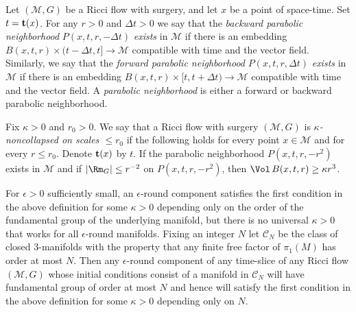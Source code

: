 \begin{definition}
\label{def:parabolic-neighborhood-surgery}
Let $({\mathcal M},G)$ be a Ricci flow with surgery, and let $x$ be
a point of space-time. Set $t={\bf t}(x)$. For any $r>0$ and $\Delta
t>0$ we say that the {\em backward parabolic neighborhood}
$P(x,t,r,-\Delta t)$ {\em exists} in ${\mathcal M}$ if there is an
embedding $B(x,t,r)\times (t-\Delta t,t]\to {\mathcal M}$ compatible
with time and the vector field. Similarly, we say
that the {\em forward parabolic neighborhood} $P(x,t,r,\Delta t)$
{\em exists} in ${\mathcal M}$ if there is an embedding
$B(x,t,r)\times [t,t+\Delta t)\to {\mathcal M}$ compatible with time
and the vector field. A {\em parabolic neighborhood} is either a
forward or backward parabolic neighborhood.
\end{definition}


\begin{definition}
\label{def:kappa-noncollapsed-surgery}
\label{defnkappa}
Fix $\kappa>0$ and $r_0>0$. We say that a Ricci flow with surgery
$({\mathcal M},G)$ is {\em $\kappa$-noncollapsed on scales $\le
r_0$} if the following holds for every point $x\in {\mathcal M}$ and
for every $r\le r_0$. Denote ${\bf t}(x)$ by $t$. If the  parabolic
neighborhood $P(x,t,r,-r^2)$ exists in ${\mathcal M}$ and if
$|\Rm_G|\le r^{-2}$ on $P(x,t,r,-r^2)$, then  $\Vol\,B(x,t,r)\ge \kappa r^3$.
\end{definition}


\begin{remark}
\label{rem:epsilon-round-kappa-dependence}
For $\epsilon>0$ sufficiently small,
an $\epsilon$-round component satisfies the first condition in the above definition
 for some $\kappa>0$ depending only on
the order of the fundamental group of the underlying manifold, but there is no universal
$\kappa>0$ that works for all $\epsilon$-round manifolds. Fixing an integer $N$ let ${\mathcal C}_N$
be the class of closed $3$-manifolds
 with the property that any finite free factor of $\pi_1(M)$
has order at most $N$. Then any $\epsilon$-round component of any
time-slice of any Ricci flow $({\mathcal M},G)$ whose initial
conditions consist of a manifold in ${\mathcal C}_N$ will have
fundamental group of order at most $N$ and hence will satisfy the first condition
in the above definition for some $\kappa>0$ depending only on $N$.
\end{remark}


